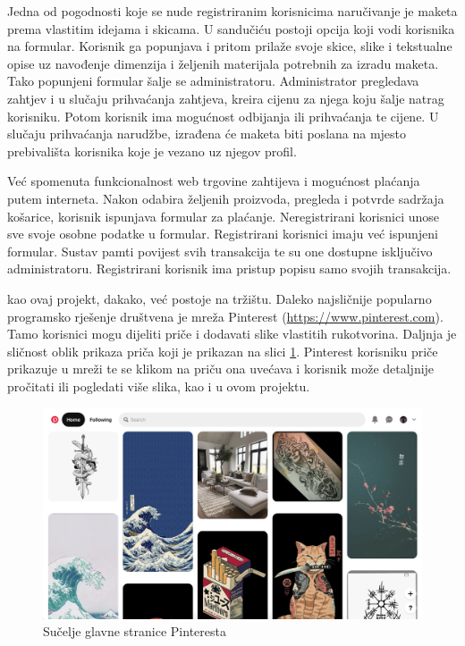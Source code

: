 		Jedna od pogodnosti koje se nude registriranim korisnicima naručivanje je maketa prema vlastitim idejama i skicama. U sandučiću postoji opcija koji vodi korisnika na formular. Korisnik ga popunjava i pritom prilaže svoje skice, slike i tekstualne opise uz navođenje dimenzija i željenih materijala potrebnih za izradu maketa. Tako popunjeni formular šalje se administratoru. Administrator pregledava zahtjev i u slučaju prihvaćanja zahtjeva, kreira cijenu za njega koju šalje natrag korisniku. Potom korisnik ima mogućnost odbijanja ili prihvaćanja te cijene. U slučaju prihvaćanja narudžbe, izrađena će maketa biti poslana na mjesto prebivališta korisnika koje je vezano uz njegov profil.
		
		Već spomenuta funkcionalnost web trgovine zahtijeva i mogućnost plaćanja putem interneta. Nakon odabira željenih proizvoda, pregleda i potvrde sadržaja košarice, korisnik ispunjava formular za plaćanje. Neregistrirani korisnici unose sve svoje osobne podatke u formular. Registrirani korisnici imaju već ispunjeni formular. Sustav pamti povijest svih transakcija te su one dostupne isključivo administratoru. Registrirani korisnik ima pristup popisu samo svojih transakcija.
		
		 kao ovaj projekt, dakako, već postoje na tržištu. Daleko najsličnije popularno programsko rješenje društvena je mreža Pinterest (\url{https://www.pinterest.com}). Tamo korisnici mogu dijeliti priče i dodavati slike vlastitih rukotvorina. Daljnja je sličnost oblik prikaza priča koji je prikazan na slici \ref{fig:pinterest}. Pinterest korisniku priče prikazuje u mreži te se klikom na priču ona uvećava i korisnik može detaljnije pročitati ili pogledati više slika, kao i u ovom projektu.
		
		\begin{figure}[H]
			\includegraphics[scale=0.32]{slike/pinterest.PNG} %
			\centering
			\caption{Sučelje glavne stranice Pinteresta}
			\label{fig:pinterest}
		\end{figure}
	
